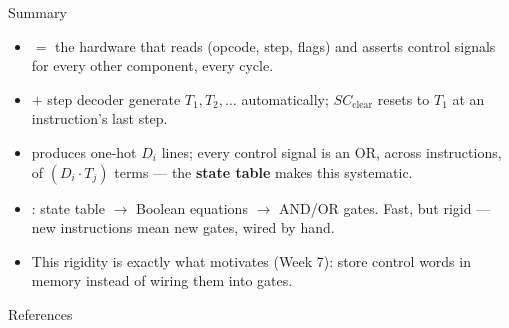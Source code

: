 \documentclass[aspectratio=169]{beamer}
\begin{document}
\begin{frame}{Summary}
  \begin{itemize}
    \item {} $=$ the hardware that reads (opcode, step, flags)
      and asserts control signals for every other component, every cycle.
    \item {} $+$ step decoder generate
      $T_1, T_2, \dots$ automatically; $SC_{\text{clear}}$ resets to $T_1$ at an
      instruction's last step.
    \item {} produces one-hot $D_i$ lines; every control signal
      is an OR, across instructions, of $(D_i \cdot T_j)$ terms --- the
      \textbf{state table} makes this systematic.
    \item {}: state table $\to$ Boolean equations $\to$
      AND/OR gates. Fast, but rigid --- new instructions mean new gates, wired by
      hand.
    \item This rigidity is exactly what motivates 
      (Week 7): store control words in memory instead of wiring them into gates.
  \end{itemize}
\end{frame}

\begin{frame}{References}
  \footnotesize
  
  
\end{frame}
\end{document}
